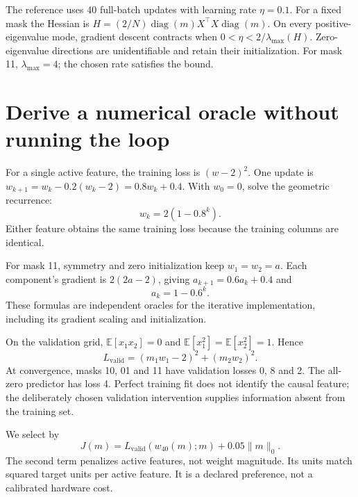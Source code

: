 The reference uses 40 full-batch updates with learning rate $\eta=0.1$.
For a fixed mask the Hessian is
$H=(2/N)\operatorname{diag}(m)X^\top X\operatorname{diag}(m)$.
On every positive-eigenvalue mode, gradient descent contracts when
$0<\eta<2/\lambda_{\max}(H)$. Zero-eigenvalue directions are unidentifiable
and retain their initialization. For mask 11, $\lambda_{\max}=4$;
the chosen rate satisfies the bound.


\section{Derive a numerical oracle without running the loop}
For a single active feature, the training loss is $(w-2)^2$.
One update is $w_{k+1}=w_k-0.2(w_k-2)=0.8w_k+0.4$.
With $w_0=0$, solve the geometric recurrence:
\begin{equation}
 w_k=2(1-0.8^k).
 \label{eq:oneweight}
\end{equation}
Either feature obtains the same training loss because the training columns
are identical.

For mask 11, symmetry and zero initialization keep $w_1=w_2=a$.
Each component's gradient is $2(2a-2)$, giving
$a_{k+1}=0.6a_k+0.4$ and
\begin{equation}
 a_k=1-0.6^k.
 \label{eq:twoweights}
\end{equation}
These formulas are independent oracles for the iterative implementation,
including its gradient scaling and initialization.

On the validation grid, $\mathbb E[x_1x_2]=0$ and
$\mathbb E[x_1^2]=\mathbb E[x_2^2]=1$. Hence
\begin{equation}
 L_{\mathrm{valid}}=(m_1w_1-2)^2+(m_2w_2)^2.
 \label{eq:validation}
\end{equation}
At convergence, masks 10, 01 and 11 have validation losses 0, 8 and 2.
The all-zero predictor has loss 4. Perfect training fit does not identify
the causal feature; the deliberately chosen validation intervention supplies
information absent from the training set.

We select by
\begin{equation}
 J(m)=L_{\mathrm{valid}}(w_{40}(m);m)+0.05\|m\|_0.
 \label{eq:score}
\end{equation}
The second term penalizes active features, not weight magnitude. Its units
match squared target units per active feature. It is a declared preference,
not a calibrated hardware cost.

